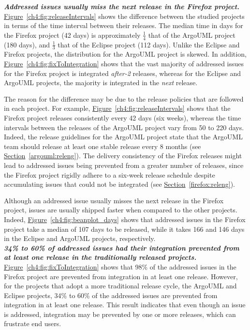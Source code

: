 \noindent\textit{\textbf{Addressed issues usually
miss the next release in the Firefox project.}}
\hyperref[ch4:fig:releaseIntervals]{Figure}~\ref{ch4:fig:releaseIntervals} shows the
difference between the studied projects in terms of the time interval between
their releases. The median time in days for the Firefox project (42 days) is
approximately $\frac{1}{4}$ that of the ArgoUML project (180 days), and
$\frac{1}{3}$ that of the Eclipse project (112 days). Unlike the Eclipse and
Firefox projects, the distribution for the ArgoUML project is skewed. In
addition, \hyperref[ch4:fig:fixToIntegration]{Figure}~\ref{ch4:fig:fixToIntegration}
shows that the vast majority of addressed issues for the Firefox project is integrated
\textit{after-2} releases, whereas for the Eclipse and ArgoUML projects, the
majority is integrated in the \textit{next} release. 

The reason for the difference may be due to the release policies that are
followed in each project. For example,
\hyperref[ch4:fig:releaseIntervals]{Figure}~\ref{ch4:fig:releaseIntervals} shows that
the Firefox project releases consistently every 42 days (six weeks), whereas the
time intervals between the releases of the ArgoUML project vary from 50 to 220
days. Indeed, the release guidelines for the ArgoUML project state that the
ArgoUML team should release at least one stable release every 8 months (see
\hyperref[argouml:releng]{Section}~\ref{argouml:releng}). The delivery
consistency of the Firefox releases might lead to addressed issues being prevented
from a greater number of releases, since the Firefox project rigidly adhere to a
six-week release schedule despite accumulating issues that could not be
integrated (see \hyperref[firefox:releng]{Section}~\ref{firefox:releng}). 

Although an addressed issue usually misses the next release in the Firefox
project, issues are usually shipped faster when compared to the other projects.
Indeed, \hyperref[ch4:fig:beanplot_days]{Figure}~\ref{ch4:fig:beanplot_days} shows that
addressed issues in the Firefox project take a median of 107 days to be
released, while it takes 166 and 146 days in the Eclipse and ArgoUML projects,
respectively.\\

\noindent\textit{\textbf{34\% to 60\% of addressed issues had their integration
prevented from at least one release in the traditionally released projects.}}
\hyperref[ch4:fig:fixToIntegration]{Figure}~\ref{ch4:fig:fixToIntegration} shows that
98\% of the addressed issues in the Firefox project are prevented from integration
in at least one release. However, for the projects that adopt a more traditional
release cycle, \ie the ArgoUML and Eclipse projects, 34\% to 60\%  of the addressed
issues are prevented from integration in at least one release. This result
indicates that even though an issue is addressed, integration may be prevented by
one or more releases, which can frustrate end users.\\

